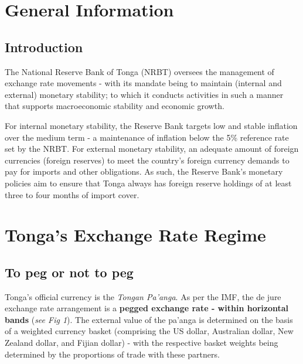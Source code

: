 \documentclass[12pt]{article}
\begin{document}
\section{General Information}
\subsection{Introduction}

The National Reserve Bank of Tonga (NRBT) oversees the management of exchange rate movements  - with its mandate being to maintain (internal and external) monetary stability; to which it conducts activities in such a manner that supports macroeconomic stability and economic growth. 

\noindent For internal monetary stability, the Reserve Bank targets low and stable inflation over the medium term - a maintenance of inflation below the 5\% reference rate set by the NRBT.
For external monetary stability, an adequate amount of foreign currencies (foreign reserves) to meet the country's foreign currency demands to pay for imports and other obligations. As such, the Reserve Bank's monetary policies aim to ensure that Tonga always has foreign reserve holdings of at least three to four months of import cover.



\section{Tonga's Exchange Rate Regime}
\subsection{To peg or not to peg}
Tonga's official currency is the \textit{Tongan Pa'anga}. As per the IMF, the de jure exchange rate arrangement is a \textbf{pegged exchange rate - within horizontal bands} (\textit{see Fig 1}). The external value of the pa'anga is determined on the basis of a weighted currency basket (comprising the US dollar, Australian dollar, New Zealand dollar, and Fijian dollar) - with the respective basket weights being determined by the proportions of trade with these partners.
\end{document}
